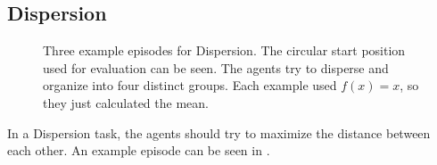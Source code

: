 \subsection{Dispersion}
\begin{figure}[htp]
    \centering
    \hspace{1cm}                       
    \caption{Three example episodes for Dispersion. The circular start position used for evaluation can be seen. The agents try to disperse and organize into four distinct groups. Each example used $f(x) = x$, so they just calculated the mean.}
    \label{fig:dispersion_example}
\end{figure}

In a Dispersion task, the agents should try to maximize the distance between each other. An example episode can be seen in .\par

